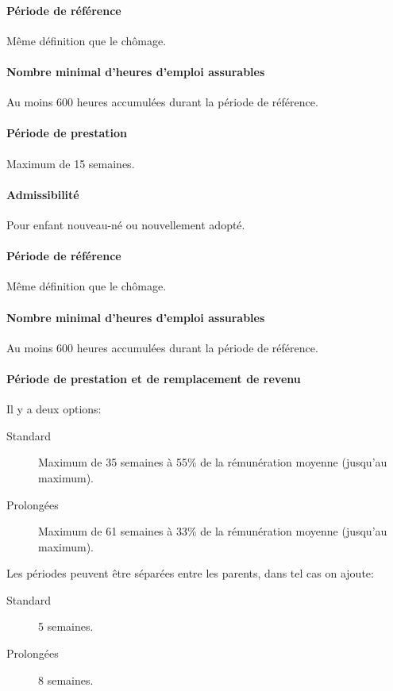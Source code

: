 \documentclass[10pt, french]{article}
\begin{document}
\begin{multicols*}{3}
\begin{definitionNOHFILL}
\paragraph{Période de référence}
Même définition que le chômage.

\paragraph{Nombre minimal d'heures d'emploi assurables}
Au moins 600 heures accumulées durant la période de référence.

\paragraph{Période de prestation}
Maximum de 15 semaines.
\end{definitionNOHFILL}

\begin{definitionNOHFILL}
\paragraph{Admissibilité}
Pour enfant nouveau-né ou nouvellement adopté.

\paragraph{Période de référence}
Même définition que le chômage.

\paragraph{Nombre minimal d'heures d'emploi assurables}
Au moins 600 heures accumulées durant la période de référence.

\paragraph{Période de prestation et de remplacement de revenu}
Il y a deux options:
\begin{description}
	\item[Standard]	Maximum de 35 semaines à 55\% de la rémunération moyenne (jusqu'au maximum).
	\item[Prolongées]	Maximum de 61 semaines à 33\% de la rémunération moyenne (jusqu'au maximum).
\end{description}

Les périodes peuvent être séparées entre les parents, dans tel cas on ajoute:
\begin{description}
	\item[Standard]	5 semaines.
	\item[Prolongées]	8 semaines.
\end{description}
\end{definitionNOHFILL}


\end{multicols*}
\end{document}
